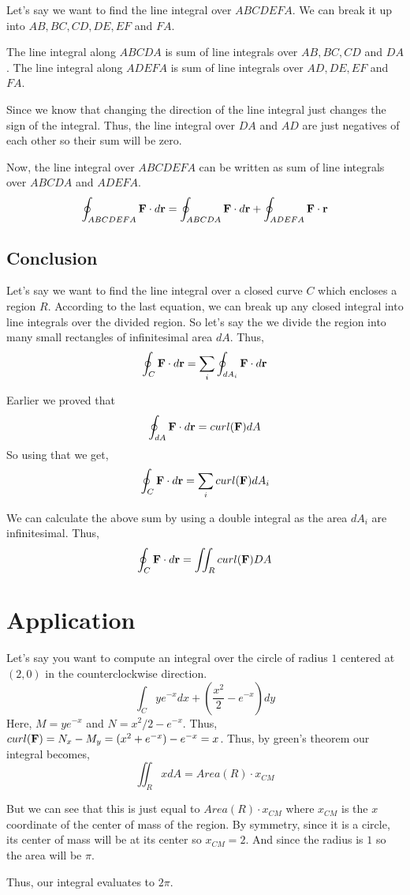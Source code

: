 Let's say we want to find the line integral over $ABCDEFA$. 
We can break it up into $AB, BC, CD, DE, EF$ and $FA$.

The line integral along $ABCDA$ is sum of line integrals over $AB, BC, CD$ and $DA$.
The line integral along $ADEFA$ is sum of line integrals over $AD, DE, EF$ and $FA$.

Since we know that changing the direction of the line integral just changes the sign of the integral.
Thus, the line integral over $DA$ and $AD$ are just negatives of each other so their sum will be zero.

Now, the line integral over $ABCDEFA$ can be written as sum of line integrals over $ABCDA$ and $ADEFA$.
$$
\oint_{ABCDEFA} {\bf F} \cdot d{\bf r} = \oint_{ABCDA} {\bf F} \cdot d{\bf r}  + \oint_{ADEFA} {\bf F} \cdot {\bf r}
$$


\subsection{Conclusion}

Let's say we want to find the line integral over a closed curve $C$ which encloses a region $R$.
According to the last equation, we can break up any closed integral into line integrals over the divided region.
So let's say the we divide the region into many small rectangles of infinitesimal area $dA$. Thus, 
$$
\oint_C {\bf F} \cdot d{\bf r} = \sum_i \oint_{dA_i} {\bf F} \cdot d{\bf r}
$$

Earlier we proved that $$\oint_{dA} {\bf F} \cdot d{\bf r} = curl({\bf F}) dA $$
So using that we get,
$$
\oint_C {\bf F} \cdot d{\bf r} = \sum_i curl({\bf F}) dA_i
$$

We can calculate the above sum by using a double integral as the area $dA_i$ are infinitesimal.
Thus,
$$
\oint_C {\bf F} \cdot d{\bf r} = \iint_R curl({\bf F}) DA
$$

\section{Application}

Let's say you want to compute an integral over the circle of radius $1$ centered at $(2, 0)$ in the counterclockwise direction.
$$
\int_C ye^{-x} dx + (\frac{x^2}{2} - e^{-x}) dy
$$
Here, $M = ye^{-x}$ and $N = x^2/2 - e^{-x}$.
Thus, $curl({\bf F}) = N_x - M_y = (x^2 + e^{-x}) - e^{-x} = x$.
Thus, by green's theorem our integral becomes,
$$ \iint_R x dA = Area(R) \cdot x_{CM} $$

But we can see that this is just equal to $Area(R) \cdot x_{CM}$ where $x_{CM}$ is the $x$ coordinate of the center of mass of the region.
By symmetry, since it is a circle, its center of mass will be at its center so $x_{CM} = 2$.
And since the radius is $1$ so the area will be $\pi$.

Thus, our integral evaluates to $2\pi$.


